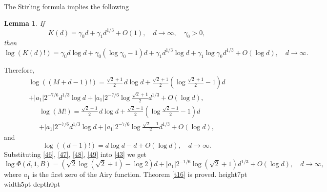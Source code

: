 \documentclass[a4paper,12pt]{article}
\numberwithin{equation}{section}
\def \ga{\gamma}
\newcommand{\<}{\langle}
\renewcommand{\>}{\rangle}
\theoremstyle{plain}
\newtheorem{lemma}[theorem]{\bf Lemma}
\theoremstyle{definition}
\theoremstyle{remark}
\renewcommand{\qed}{\vrule height7pt width5pt depth0pt}
\begin{document}
The Stirling formula implies the following

\begin{lemma}
\label{l42}
If 
$$
K(d) = \ga_0 d + \ga_1 d^{1/3} + O(1), \quad d \to \infty, \quad \ga_0 > 0,
$$
then
$$
\log \left(K(d)!\right) = \ga_0 d \log d + \ga_0 (\log \ga_0 -1) d 
+ \ga_1 d^{1/3} \log d + \ga_1 \log \ga_0 d^{1/3} + O (\log d), \quad d \to \infty.
$$
\end{lemma}

Therefore,
\begin{eqnarray}
\nonumber
\log \left((M+d-1)!\right) 
= \frac{\sqrt 2 + 1}2\, d \log d + \frac{\sqrt 2 + 1}2 \left(\log \frac{\sqrt 2 + 1}2 - 1\right) d \\
+ |a_1| 2^{-7/6} d^{1/3} \log d + |a_1| 2^{-7/6} \log \frac{\sqrt 2 + 1}2 d^{1/3} + O(\log d),
\label{47}
\end{eqnarray}
\begin{eqnarray}
\nonumber
\log \left(M!\right) 
= \frac{\sqrt 2 - 1}2\, d \log d + \frac{\sqrt 2 - 1}2 \left(\log \frac{\sqrt 2 - 1}2 - 1\right) d \\
+ |a_1| 2^{-7/6} d^{1/3} \log d + |a_1| 2^{-7/6} \log \frac{\sqrt 2 - 1}2 d^{1/3} + O(\log d),
\label{48}
\end{eqnarray}
and
\begin{equation}
\label{49}
\log \left((d-1)!\right)
= d \log d - d + O (\log d), \quad d \to \infty.
\end{equation}
Substituting \eqref{46}, \eqref{47}, \eqref{48}, \eqref{49} into \eqref{43} we get
\begin{equation}
\label{410}
\log \Phi (d,1,B) 
= \left(\sqrt 2 \log (\sqrt 2 + 1) - \log 2\right) d
+ |a_1| 2^{-1/6} \log (\sqrt 2 + 1) d^{1/3} + O (\log d), \quad d \to \infty,
\end{equation}
where $a_1$ is the first zero of the Airy function.
Theorem \ref{t16} is proved.
\qed
\end{document}
